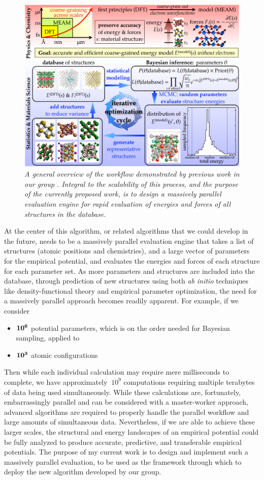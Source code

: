 \documentclass{article}
\begin{document}
\begin{figure}[h!]
  \centering
  \includegraphics[width=0.65\linewidth]{workflow.png}
  \caption{\textit{A general overview of the workflow demonstrated by previous work in our group \cite{dbopt}. Integral to the scalability of this process, and the purpose of the currently proposed work, is to design a massively parallel evaluation engine for rapid evaluation of energies and forces of all structures in the database.}}
  \label{fig:workflow}
\end{figure}

At the center of this algorithm, or related algorithms that we could develop in the future, needs to be a massively parallel evaluation engine that takes a list of structures (atomic positions and chemistries), and a large vector of parameters for the empirical potential, and evaluates the energies and forces of each structure for each parameter set. As more parameters and structures are included into the database, through prediction of new structures using both \textit{ab initio} techniques like density-functional theory and empirical parameter optimization, the need for a massively parallel approach becomes readily apparent. For example, if we consider

\begin{itemize}
    \item $\bf{10^6}$ potential parameters, which is on the order needed for Bayesian sampling, applied to
    \item $\bf{10^3}$ atomic configurations
\end{itemize}

\noindent Then while each individual calculation may require mere milliseconds to complete, we have approximately $~10^9$ computations requiring multiple terabytes of data being used simultaneously. While these calculations are, fortunately, embarrassingly parallel and can be considered with a master-worker approach, advanced algorithms are required to properly handle the parallel workflow and large amounts of simultaneous data. Nevertheless, if we are able to achieve these larger scales, the structural and energy landscapes of an empirical potential could be fully analyzed to produce accurate, predictive, and transferable empirical potentials. The purpose of my current work is to design and implement such a massively parallel evaluation, to be used as the framework through which to deploy the new algorithm developed by our group.
\end{document}
